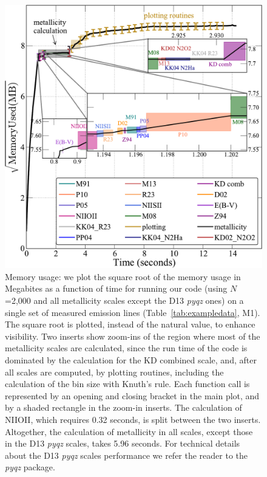 \documentclass{emulateapj}
\begin{document}
\begin{figure}[ht!]
  \includegraphics[width=1.0\columnwidth]{memusage.pdf}
   \caption{Memory usage: we plot the square root of the memory usage in Megabites as a function of time for running our code (using $N$=2,000 and all metallicity scales except the D13 \emph{pyqz} ones) on a single set of measured emission lines (Table~\ref{tab:exampledata}, M1). The square root is plotted, instead of the natural value, to enhance visibility.  
Two inserts show zoom-ins of the region where most of the metallicity scales are calculated, since the run time of the code is dominated by the calculation for the KD combined scale, and, after all scales are computed, by plotting routines, including the calculation of the bin size with Knuth's rule. 
Each function call is represented by an opening and closing bracket in the main plot, and by a shaded rectangle in the zoom-in inserts.%
The calculation of NIIOII, which requires 0.32 seconds, is split between the two inserts. Altogether, the calculation of metallicity in all scales, except those in the D13 \emph{pyqz} scales, takes 5.96 seconds. For technical details about the D13 \emph{pyqz} scales performance we refer the reader to the \emph{pyqz} package.}
 \label{fig:mem}
\end{figure}
\end{document}
